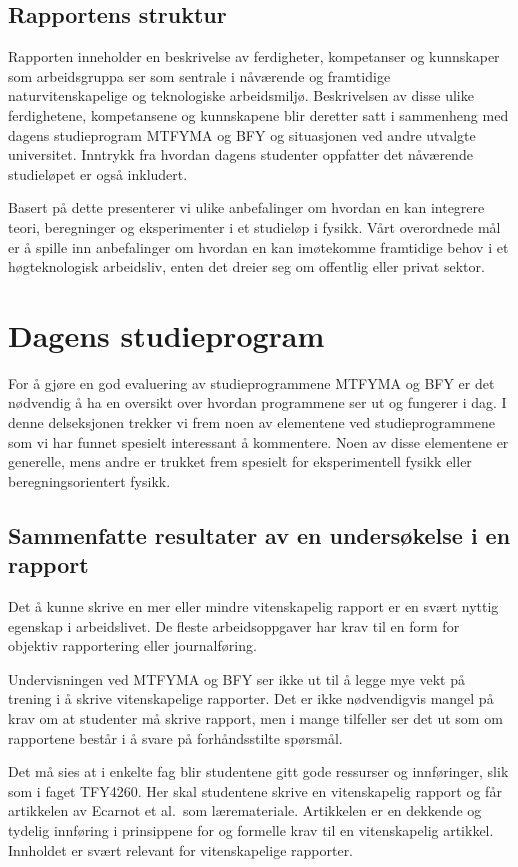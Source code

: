 \documentclass{article}
\begin{document}
\subsection{Rapportens struktur}
Rapporten inneholder en beskrivelse av ferdigheter, kompetanser og kunnskaper som arbeidsgruppa ser som sentrale i nåværende og framtidige naturvitenskapelige og teknologiske arbeidsmiljø. Beskrivelsen av disse ulike ferdighetene, kompetansene og kunnskapene blir deretter satt i sammenheng med dagens studieprogram MTFYMA og BFY og situasjonen ved andre utvalgte universitet. Inntrykk fra hvordan dagens studenter oppfatter det nåværende studieløpet er også inkludert.

Basert på dette presenterer vi ulike anbefalinger om hvordan en kan integrere teori, beregninger og eksperimenter i et studieløp i fysikk. Vårt overordnede mål er å spille inn anbefalinger om hvordan en kan imøtekomme framtidige behov i et høgteknologisk arbeidsliv, enten det dreier seg om offentlig eller privat sektor.

\section{Dagens studieprogram}
\label{Sammenlikning}
For å gjøre en god evaluering av studieprogrammene MTFYMA og BFY er det nødvendig å ha en oversikt over hvordan programmene ser ut og fungerer i dag. I denne delseksjonen trekker vi frem noen av elementene ved studieprogrammene som vi har funnet spesielt interessant å kommentere. Noen av disse elementene er generelle, mens andre er trukket frem spesielt for eksperimentell fysikk eller beregningsorientert fysikk.

\subsection{Sammenfatte resultater av en undersøkelse i en rapport}
\label{Rapport}
Det å kunne skrive en mer eller mindre vitenskapelig rapport er en svært nyttig egenskap i arbeidslivet. De fleste arbeidsoppgaver har krav til en form for objektiv rapportering eller journalføring.

Undervisningen ved MTFYMA og BFY ser ikke ut til å legge mye vekt på trening i å skrive vitenskapelige rapporter. Det er ikke nødvendigvis mangel på krav om at studenter må skrive rapport, men i mange tilfeller ser det ut som om rapportene består i å svare på forhåndsstilte spørsmål.

Det må sies at i enkelte fag blir studentene gitt gode ressurser og innføringer, slik som i faget TFY4260. Her skal studentene skrive en vitenskapelig rapport og får artikkelen av Ecarnot et al.~som læremateriale. Artikkelen er en dekkende og tydelig innføring i prinsippene for og formelle krav til en vitenskapelig artikkel. Innholdet er svært relevant for vitenskapelige rapporter.
\end{document}

